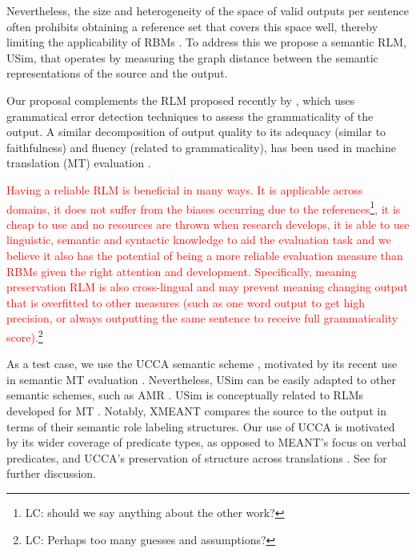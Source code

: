 \documentclass[a4paper, 11pt]{article}
\newcommand{\lc}[1]{\footnote{\color{blue}LC: #1}}
\begin{document}
Nevertheless, the size and heterogeneity of the space of valid outputs per sentence often prohibits
obtaining a reference set that covers this space well, thereby limiting the applicability
of RBMs \cite{bryant2015far}.
To address this we propose a semantic RLM, {\sc USim}, that
operates by measuring the graph distance between the semantic
representations of the source and the output.

Our proposal complements the RLM proposed recently by 
, which uses grammatical error detection techniques to assess the grammaticality of the output.
A similar decomposition of output quality to its adequacy (similar to faithfulness)
and fluency (related to grammaticality), has been used in machine translation (MT)
evaluation \cite[e.g.,][]{banchs2015adequacy}.

\textcolor{red}{Having a reliable RLM is beneficial in many ways. It is applicable across domains, it does not suffer from the biases occurring due to the references\lc{should we say anything about the other work?}, it is cheap to use and no resources are thrown when research develops, it is able to use linguistic, semantic and syntactic knowledge to aid the evaluation task and we believe it also has the potential of being a more reliable evaluation measure than RBMs given the right attention and development. Specifically, meaning preservation RLM is also cross-lingual and may prevent meaning changing output that is overfitted to other measures (such as one word output to get high precision, or always outputting the same sentence to receive full grammaticality score).\lc{Perhaps too many guesses and assumptions?} }

As a test case, we use the UCCA semantic scheme \cite{abend2013universal},
motivated by its recent use in semantic MT evaluation \cite{birch2016hume}.
Nevertheless, {\sc USim} can be easily adapted to other semantic schemes, such as AMR \cite{banarescu-EtAl:2013:LAW7-ID}.
{\sc USim} is conceptually related to RLMs developed
for MT
\cite{reeder2006measuring,albrecht2007regression,specia2009estimating,specia2010machine}.
Notably, XMEANT \cite{lo2014xmeant} compares the source to the output
in terms of their semantic role labeling structures.
Our use of UCCA is motivated by its wider coverage of predicate types, as opposed to 
MEANT's focus on verbal predicates, and UCCA's preservation
of structure across translations \cite{sulem2015conceptual}.
See \cite{birch2016hume} for further discussion. 

\end{document}
